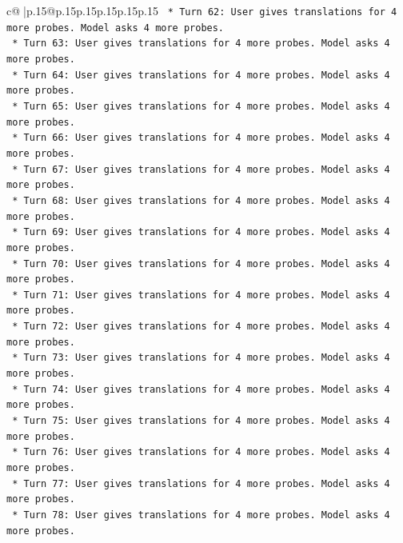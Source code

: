 \documentclass{article}
\begin{document}
{\begin{supertabular}{c@{$\;$}|p{.15\linewidth}@{}p{.15\linewidth}p{.15\linewidth}p{.15\linewidth}p{.15\linewidth}p{.15\linewidth}}
{{{\texttt{                    *   Turn 62: User gives translations for 4 more probes. Model asks 4 more probes.} \\
\texttt{                    *   Turn 63: User gives translations for 4 more probes. Model asks 4 more probes.} \\
\texttt{                    *   Turn 64: User gives translations for 4 more probes. Model asks 4 more probes.} \\
\texttt{                    *   Turn 65: User gives translations for 4 more probes. Model asks 4 more probes.} \\
\texttt{                    *   Turn 66: User gives translations for 4 more probes. Model asks 4 more probes.} \\
\texttt{                    *   Turn 67: User gives translations for 4 more probes. Model asks 4 more probes.} \\
\texttt{                    *   Turn 68: User gives translations for 4 more probes. Model asks 4 more probes.} \\
\texttt{                    *   Turn 69: User gives translations for 4 more probes. Model asks 4 more probes.} \\
\texttt{                    *   Turn 70: User gives translations for 4 more probes. Model asks 4 more probes.} \\
\texttt{                    *   Turn 71: User gives translations for 4 more probes. Model asks 4 more probes.} \\
\texttt{                    *   Turn 72: User gives translations for 4 more probes. Model asks 4 more probes.} \\
\texttt{                    *   Turn 73: User gives translations for 4 more probes. Model asks 4 more probes.} \\
\texttt{                    *   Turn 74: User gives translations for 4 more probes. Model asks 4 more probes.} \\
\texttt{                    *   Turn 75: User gives translations for 4 more probes. Model asks 4 more probes.} \\
\texttt{                    *   Turn 76: User gives translations for 4 more probes. Model asks 4 more probes.} \\
\texttt{                    *   Turn 77: User gives translations for 4 more probes. Model asks 4 more probes.} \\
\texttt{                    *   Turn 78: User gives translations for 4 more probes. Model asks 4 more probes.} \\
}}}
\end{supertabular}}
\end{document}
